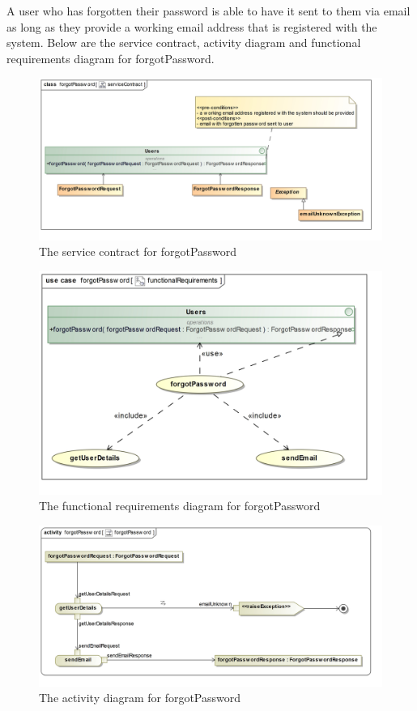 A user who has forgotten their password is able to have it sent to them via email as long as they provide a working email address that is registered with the system.  Below are the service contract, activity diagram and functional requirements diagram for forgotPassword.

\begin{figure}[H]
	\centering
	\includegraphics[scale=0.21]{../images/funcReq/forgotPasswordServiceContract.jpg}
	\caption{The service contract for forgotPassword \label{overflow}}
\end{figure}

\begin{figure}[H]
	\centering
	\includegraphics[width=1.1\textwidth]{../images/funcReq/forgotPasswordFunctionalRequirements.jpg}
	\caption{The functional requirements diagram for forgotPassword \label{overflow}}
\end{figure}

\begin{figure}[H]
	\centering
	\includegraphics[scale=0.22]{../images/funcReq/forgotPasswordActivityDiagram.jpg}
	\caption{The activity diagram for forgotPassword \label{overflow}}
\end{figure}

